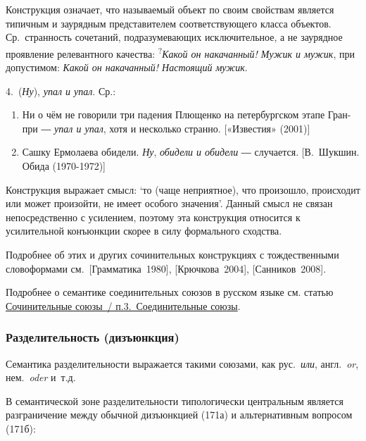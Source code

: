 Конструкция означает, что называемый объект по своим свойствам является
типичным и заурядным представителем соответствующего класса объектов.
Ср.~странность сочетаний, подразумевающих исключительное, а не заурядное
проявление релевантного качества: \textsuperscript{?}\emph{Какой он
накачанный! Мужик и мужик}, при допустимом: \emph{Какой он накачанный!
Настоящий мужик}.

4.~(\emph{Ну}), \emph{упал и упал}. Ср.:

\begin{enumerate}
\def\labelenumi{(\arabic{enumi})}
\setcounter{enumi}{168}
\item
  Ни о чём не говорили три падения Плющенко на петербургском этапе
  Гран-при ― \emph{упал и упал}, хотя и несколько странно. {[}«Известия»
  (2001){]}
\item
  Сашку Ермолаева обидели. \emph{Ну}, \emph{обидели и обидели} ―
  случается. {[}В.~Шукшин. Обида (1970-1972){]}
\end{enumerate}

Конструкция выражает смысл: `то (чаще неприятное), что произошло,
происходит или может произойти, не имеет особого значения'. Данный смысл
не связан непосредственно с усилением, поэтому эта конструкция относится
к усилительной конъюнкции скорее в силу формального сходства.

Подробнее об этих и других сочинительных конструкциях с тождественными
словоформами см.~{[}Грамматика~1980{]}, {[}Крючкова~2004{]},
{[}Санников~2008{]}.

Подробнее о семантике соединительных союзов в русском языке см. статью
\underline{Сочинительные союзы~/ п.3.~Соединительные союзы}.

\hypertarget{ux440ux430ux437ux434ux435ux43bux438ux442ux435ux43bux44cux43dux43eux441ux442ux44c-ux434ux438ux437ux44aux44eux43dux43aux446ux438ux44f}{%
\subsubsection{Разделительность
(дизъюнкция)}\label{ux440ux430ux437ux434ux435ux43bux438ux442ux435ux43bux44cux43dux43eux441ux442ux44c-ux434ux438ux437ux44aux44eux43dux43aux446ux438ux44f}}

Семантика разделительности выражается такими союзами, как
рус.~\emph{или}, англ.~\emph{or}, нем.~\emph{oder} и~т.д.

В семантической зоне разделительности типологически центральным является
разграничение между обычной дизъюнкцией (171а) и альтернативным вопросом
(171б):

